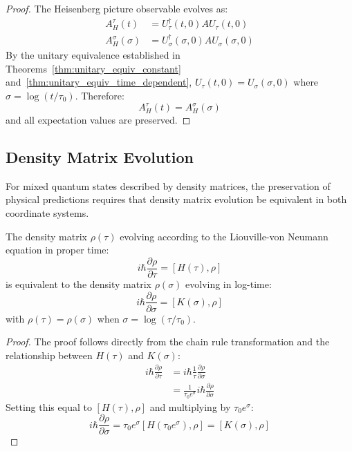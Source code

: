 \begin{proof}
The Heisenberg picture observable evolves as:
\begin{align}
A_H^\tau(t) &= U_\tau^\dagger(t,0) A U_\tau(t,0) \\
A_H^\sigma(\sigma) &= U_\sigma^\dagger(\sigma,0) A U_\sigma(\sigma,0)
\end{align}
By the unitary equivalence established in Theorems~\ref{thm:unitary_equiv_constant} and~\ref{thm:unitary_equiv_time_dependent}, $U_\tau(t,0) = U_\sigma(\sigma,0)$ where $\sigma = \log(t/\tau_0)$. Therefore:
\begin{equation}
A_H^\tau(t) = A_H^\sigma(\sigma)
\end{equation}
and all expectation values are preserved.
\end{proof}

\subsection{Density Matrix Evolution}
\label{subsec:density_matrix}

For mixed quantum states described by density matrices, the preservation of physical predictions requires that density matrix evolution be equivalent in both coordinate systems.

\begin{theorem}
\label{thm:density_matrix_equivalence}
The density matrix $\rho(\tau)$ evolving according to the Liouville-von Neumann equation in proper time:
\begin{equation}
i\hbar \frac{\partial \rho}{\partial \tau} = [H(\tau), \rho]
\end{equation}
is equivalent to the density matrix $\rho(\sigma)$ evolving in log-time:
\begin{equation}
i\hbar \frac{\partial \rho}{\partial \sigma} = [K(\sigma), \rho]
\label{eq:density_matrix_evolution}
\end{equation}
with $\rho(\tau) = \rho(\sigma)$ when $\sigma = \log(\tau/\tau_0)$.
\end{theorem}

\begin{proof}
The proof follows directly from the chain rule transformation and the relationship between $H(\tau)$ and $K(\sigma)$:
\begin{align}
i\hbar \frac{\partial \rho}{\partial \tau} &= i\hbar \frac{1}{\tau} \frac{\partial \rho}{\partial \sigma} \\
&= \frac{1}{\tau_0 e^\sigma} i\hbar \frac{\partial \rho}{\partial \sigma}
\end{align}
Setting this equal to $[H(\tau), \rho]$ and multiplying by $\tau_0 e^\sigma$:
\begin{equation}
i\hbar \frac{\partial \rho}{\partial \sigma} = \tau_0 e^\sigma [H(\tau_0 e^\sigma), \rho] = [K(\sigma), \rho]
\end{equation}
\end{proof}

